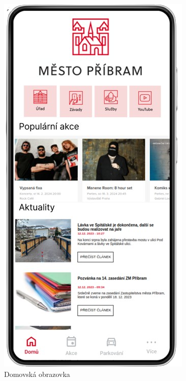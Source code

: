 \begin{figure}[H]
    \includegraphics[width=\linewidth]{screen1.png}
    \caption{Domovská obrazovka}
  \endminipage\hfill

\end{figure}
